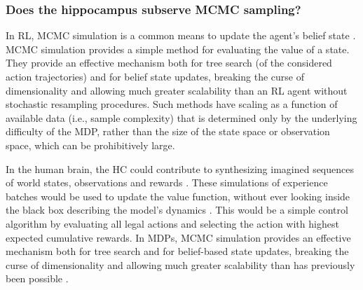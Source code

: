 \documentclass[10pt,letterpaper]{article}
\begin{document}
\subsubsection{Does the hippocampus subserve MCMC sampling?}
In RL, MCMC simulation is a common means to update the agent's belief state
\citep{silver2010monte}.
MCMC simulation provides a simple method for evaluating the value of a state.
They provide an effective mechanism both for tree search (of the considered
action trajectories)
and for belief state updates, breaking the curse of dimensionality and allowing much greater scalability than an RL agent without stochastic resampling procedures.
Such methods have scaling as a function of available data (i.e., sample complexity) that
is determined only by the underlying difficulty of the MDP, rather than the size of the state space or observation space,
which can be prohibitively large.

In the human brain,
the HC could contribute to synthesizing imagined sequences of world states,
observations and rewards \citep{aronov2017, chao2017interaction, boyer2008evolutionary}.
These simulations of experience batches
would be used to update the value function, without ever looking inside the black box describing the model's dynamics \citep{lavilleon2015}.
This would be a simple control algorithm by evaluating all legal actions and selecting the action with
highest expected cumulative rewards.
In MDPs, MCMC simulation provides an effective mechanism both for tree search and for belief-based state updates, breaking the curse of dimensionality and allowing much greater scalability than has previously been possible \citep{silver2016mastering}.
\end{document}
